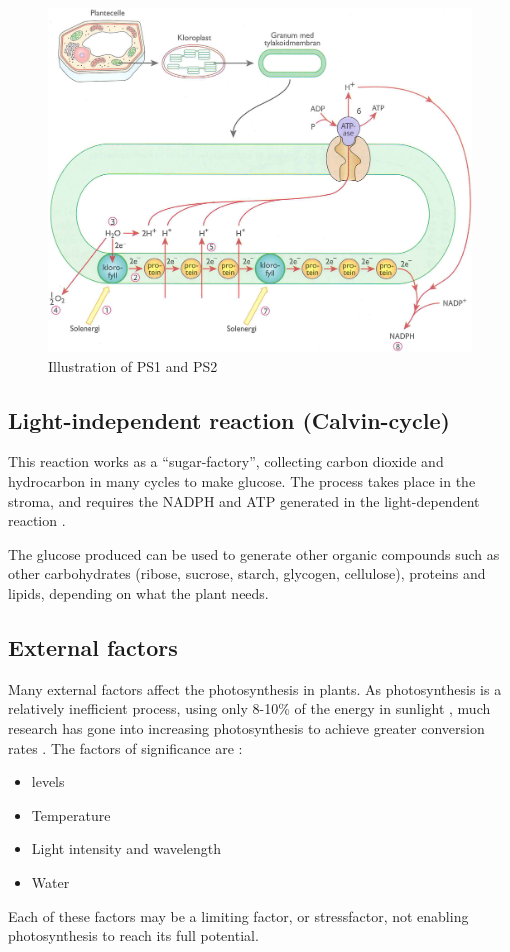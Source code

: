 \begin{figure}
\centering
\includegraphics[width=\textwidth]{img/photosynthesis/light_dependent.png}
\caption{Illustration of PS1 and PS2 \citep{bios}}
\label{fig:photosystem}
\end{figure}

\subsection{Light-independent reaction (Calvin-cycle)}
This reaction works as a “sugar-factory”, collecting carbon dioxide and hydrocarbon in many cycles to make glucose. The process takes place in the stroma, and requires the NADPH and ATP generated in the light-dependent reaction \citep{bi2}. 

The glucose produced can be used to generate other organic compounds such as other carbohydrates (ribose, sucrose, starch, glycogen, cellulose), proteins and lipids, depending on what the plant needs.

\subsection{External factors}
Many external factors affect the photosynthesis in plants. As photosynthesis is a relatively inefficient process, using only 8-10\% of the energy in sunlight \citetext{Long et. al, 2006; Zhu et. al, 2010, referenced in \citealp{kirschbaum2011does}}, much research has gone into increasing photosynthesis to achieve greater conversion rates \citetext{Reynolds et al., 2000; Sinclair et al., 2004; Long et al., 2006; Zhu et al., 2010, referenced in \citealp{kirschbaum2011does}}. The factors of significance are \citep{bios}:
\begin{itemize}
\item {} levels
\item Temperature
\item Light intensity and wavelength
\item Water
\end{itemize}
Each of these factors may be a limiting factor, or stressfactor, not enabling photosynthesis to reach its full potential. 

